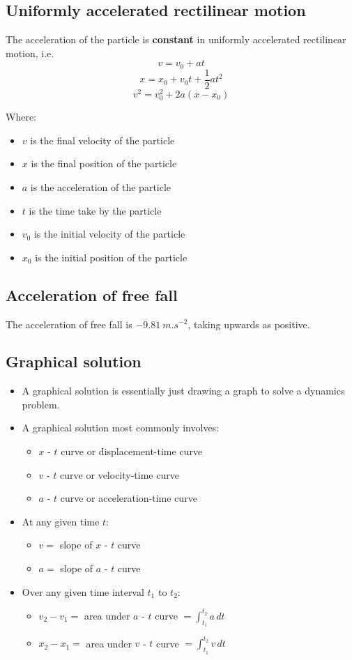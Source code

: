 \documentclass[11pt]{article}
\begin{document}
\subsection{Uniformly accelerated rectilinear motion}
\label{sec:org6b19c2b}
The acceleration of the particle is \textbf{constant} in uniformly accelerated rectilinear motion, i.e.
\[v = v_0 + at\]
\[x = x_0 + v_0t + \frac{1}{2}at^2\]
\[v^2 = v_0^2 + 2a(x - x_0)\]

Where:
\begin{itemize}
\item \(v\) is the final velocity of the particle
\item \(x\) is the final position of the particle
\item \(a\) is the acceleration of the particle
\item \(t\) is the time take by the particle
\item \(v_0\) is the initial velocity of the particle
\item \(x_0\) is the initial position of the particle
\end{itemize}

 \newpage

\subsection{Acceleration of free fall}
\label{sec:org4b8f170}
The acceleration of free fall is \(\qty{-9.81}{m.s^{-2}}\), taking upwards as positive.

\subsection{Graphical solution}
\label{sec:org68da30d}
\begin{itemize}
\item A graphical solution is essentially just drawing a graph to solve a dynamics problem.
\item A graphical solution most commonly involves:
\begin{itemize}
\item \(x\) - \(t\) curve or displacement-time curve
\item \(v\) - \(t\) curve or velocity-time curve
\item \(a\) - \(t\) curve or acceleration-time curve
\end{itemize}
\item At any given time \(t\):
\begin{itemize}
\item \(v =\) slope of \(x\) - \(t\) curve
\item \(a =\) slope of \(a\) - \(t\) curve
\end{itemize}
\item Over any given time interval \(t_1\) to \(t_2\):
\begin{itemize}
\item \(v_2 - v_1 =\) area under \(a\) - \(t\) curve \(= \int_{t_1}^{t_2} a \, dt\)
\item \(x_2 - x_1 =\) area under \(v\) - \(t\) curve \(= \int_{t_1}^{t_2} v \, dt\)
\end{itemize}
\end{itemize}
\end{document}
